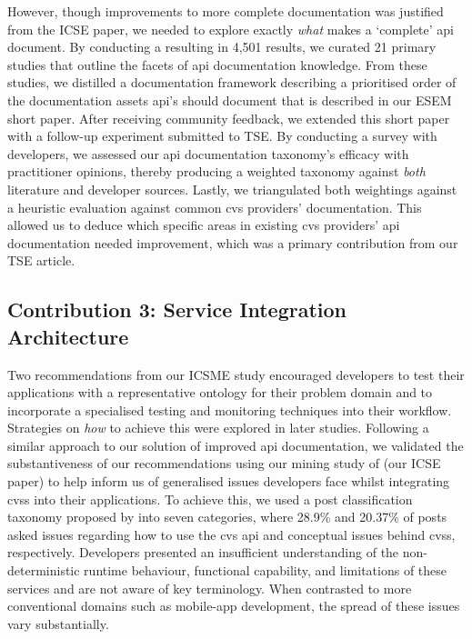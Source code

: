 However, though improvements to more complete documentation was justified from the ICSE paper, we needed to explore exactly \textit{what} makes a `complete' \gls{api} document. By conducting a  resulting in 4,501 results, we curated 21 primary studies that outline the facets of \gls{api} documentation knowledge. From these studies, we distilled a documentation framework describing a prioritised order of the documentation assets \gls{api}'s should document that is described in our ESEM short paper. After receiving community feedback, we extended this short paper with a follow-up experiment submitted to TSE. By conducting a survey with developers, we assessed our \gls{api} documentation taxonomy's efficacy with practitioner opinions, thereby producing a weighted taxonomy against \textit{both} literature and developer sources. Lastly, we triangulated both weightings against a heuristic evaluation against common \gls{cvs} providers' documentation. This allowed us to deduce which specific areas in existing \gls{cvs} providers' \gls{api} documentation needed improvement, which was a primary contribution from our TSE article.

\subsection{Contribution 3: Service Integration Architecture}

Two recommendations from our ICSME study encouraged developers to test their applications with a representative ontology for their problem domain and to incorporate a specialised testing and monitoring techniques into their workflow. Strategies on \textit{how} to achieve this were explored in later studies.  Following a similar approach to our solution of improved \gls{api} documentation, we validated the substantiveness of our recommendations using our mining study of  (our ICSE paper) to help inform us of generalised issues developers face whilst integrating \glspl{cvs} into their applications. To achieve this, we used a  post classification taxonomy proposed by \citet{Beyer:2018fm} into seven categories, where 28.9\% and 20.37\% of posts asked issues regarding how to use the \gls{cvs} \gls{api} and conceptual issues behind \glspl{cvs}, respectively. Developers presented an insufficient understanding of the non-deterministic runtime behaviour, functional capability, and limitations of these services and are not aware of key  terminology. When contrasted to more conventional domains such as mobile-app development, the spread of these issues vary substantially.

